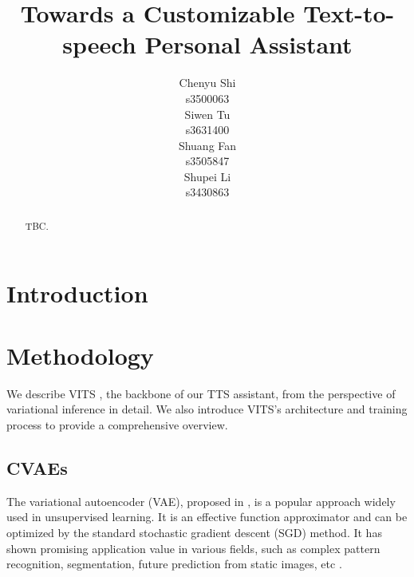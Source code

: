 \documentclass{article}
\title{Towards a Customizable Text-to-speech Personal Assistant}
\author{
 Chenyu Shi\\
   s3500063\\
   \And
 Siwen Tu\\
   s3631400\\
   \And
 Shuang Fan \\
   s3505847\\
   \And
 Shupei Li \\
   s3430863\\
}
\begin{document}
\maketitle
\begin{abstract}
TBC.
\end{abstract}




\section{Introduction}\label{sec:intro}


\section{Methodology}
\label{sec:method}

We describe VITS \cite{2021kim}, the backbone of our TTS assistant, from the perspective of variational inference in detail. We also introduce VITS's architecture and training process to provide a comprehensive overview.

\subsection{CVAEs}
The variational autoencoder (VAE), proposed in \cite{2022kingma}, is a popular approach widely used in unsupervised learning. It is an effective function approximator and can be optimized by the standard stochastic gradient descent (SGD) method. It has shown promising application value in various fields, such as complex pattern recognition, segmentation, future prediction from static images, etc \cite{2021doersch}.
\end{document}
